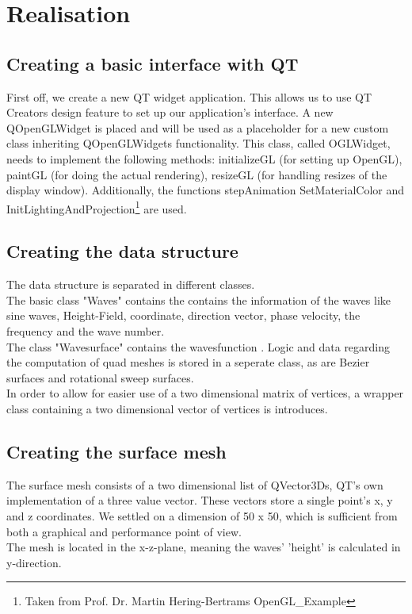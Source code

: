 ﻿\documentclass[12pt,a4paper]{scrartcl}
\begin{document}
\section{Realisation}

\subsection{Creating a basic interface with QT}
First off, we create a new QT widget application. This allows us to use QT Creators design feature to set up our application's interface. A new QOpenGLWidget is placed and will be used as a placeholder for a new custom class inheriting QOpenGLWidgets functionality. This class, called OGLWidget, needs to implement the following methods: initializeGL (for setting up OpenGL), paintGL (for doing the actual rendering), resizeGL (for handling resizes of the display window). Additionally, the functions stepAnimation SetMaterialColor and InitLightingAndProjection\footnote{Taken from Prof. Dr. Martin Hering-Bertrams OpenGL_Example} are used.

\subsection{Creating the data structure}
The data structure is separated in different classes. \\
The basic class "Waves" contains the contains the information of the waves like sine waves, Height-Field, coordinate, direction vector, phase velocity, the frequency and the wave number.  \\ 
The class "Wavesurface" contains the wavesfunction . 
Logic and data regarding the computation of quad meshes is stored in a seperate class, as are Bezier surfaces and rotational sweep surfaces. \\
In order to allow for easier use of a two dimensional matrix of vertices, a wrapper class containing a two dimensional vector of vertices is introduces. \\


\subsection{Creating the surface mesh}
The surface mesh consists of a two dimensional list of QVector3Ds, QT's own implementation of a three value vector. These vectors store a single point's x, y and z coordinates. We settled on a dimension of 50 x 50, which is sufficient from both a graphical and performance point of view.\\
The mesh is located in the x-z-plane, meaning the waves' 'height' is calculated in y-direction.\\
\end{document}
